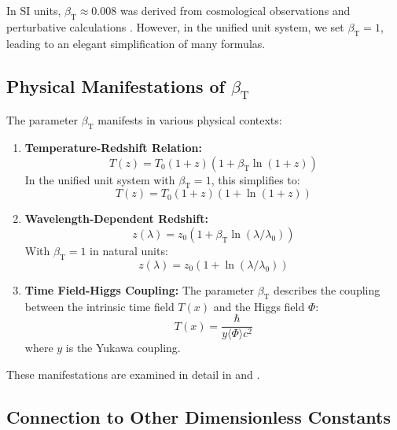 \documentclass[12pt,a4paper]{article}
\newcommand{\Tfield}{T(x)}
\newcommand{\betaT}{\beta_{\text{T}}}
\begin{document}
	In SI units, \(\betaT \approx 0.008\) was derived from cosmological observations and perturbative calculations \cite{pascher_params_2025}. However, in the unified unit system, we set \(\betaT = 1\), leading to an elegant simplification of many formulas.
	
	\subsection{Physical Manifestations of \(\betaT\)}
	\label{subsec:beta_manifestations}
	
	The parameter \(\betaT\) manifests in various physical contexts:
	
	\begin{enumerate}
		\item \textbf{Temperature-Redshift Relation:} 
		\begin{equation}
			\label{eq:temp_redshift}
			T(z) = T_0 (1 + z) (1 + \betaT \ln(1 + z))
		\end{equation}
		In the unified unit system with \(\betaT = 1\), this simplifies to:
		\begin{equation}
			T(z) = T_0 (1 + z) (1 + \ln(1 + z))
		\end{equation}
		\item \textbf{Wavelength-Dependent Redshift:} 
		\begin{equation}
			z(\lambda) = z_0 (1 + \betaT \ln(\lambda/\lambda_0))
		\end{equation}
		With \(\betaT = 1\) in natural units:
		\begin{equation}
			z(\lambda) = z_0 (1 + \ln(\lambda/\lambda_0))
		\end{equation}
		\item \textbf{Time Field-Higgs Coupling:} The parameter \(\betaT\) describes the coupling between the intrinsic time field \(\Tfield\) and the Higgs field \(\Phi\):
		\begin{equation}
			\Tfield = \frac{\hbar}{y \langle \Phi \rangle c^2}
		\end{equation}
		where \(y\) is the Yukawa coupling.
	\end{enumerate}
	
	These manifestations are examined in detail in \cite{pascher_params_2025} and \cite{pascher_alphabeta_2025}.
	
	\subsection{Connection to Other Dimensionless Constants}
	\label{subsec:connection_constants}
	
\end{document}
